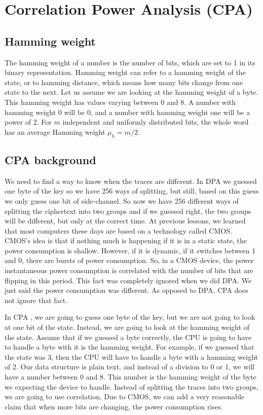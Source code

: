 \section{Correlation Power Analysis (CPA)}\label{c8_cpa:sec}

\subsection{Hamming weight}\label{c8_CPA_hamming_weight:subsec}

The hamming weight \cite{hamming} of a number is the number of bits, which are set to 1 in its binary
representation. Hamming weight can refer to a hamming weight of the state, or to
hamming distance, which means how many bits change from one state to the
next. Let us assume we are looking at the hamming weight of a byte. This hamming
weight has values varying between 0 and 8. A number with hamming weight 0 will be 0, and
a number with hamming weight one will be a power of 2. For $m$ independent and uniformly
distributed bits, the whole word has an average Hamming weight $\mu_h = m/2$.

\subsection{CPA background}\label{c8_CPA_background:subsec}

We need to find a way to know when the traces are different. In DPA \cite{kocher1999differential, kocher1998introduction} we guessed
one byte of the key so we have 256 ways of splitting, but still, based on this
guess we only guess one bit of side-channel. So now we have 256 different ways
of splitting the ciphertext into two groups and if we guessed right, the two
groups will be different, but only at the correct time.
At previous lessons, we learned that most computers these days are based on
a technology called CMOS. CMOS's idea is that if nothing much is happening
if it is in a static state,  the power consumption is shallow. However, if it is
dynamic, if it switches between 1 and 0, there are bursts of power consumption.
So, in a CMOS device, the power instantaneous power consumption is correlated
with the number of bits that are flipping in this period. This fact was
completely ignored when we did DPA. We just said the power consumption was
different. As opposed to DPA, CPA does not ignore that fact. 

In CPA \cite{brier2004correlation, coron1962statistics, mayer2000smartly, oswald2003side},
we are going to guess one byte of the key, but we are not going to look
at one bit of the state. Instead, we are going to look at the hamming weight of the
state. Assume that if we guessed a byte correctly, the CPU is going to have to
handle a byte with it is the hamming weight. For example, if we guessed that the
state was 3, then the CPU will have to handle a byte with a hamming weight of 2.
Our data structure is plain text, and instead of a division to 0 or 1, we will
have a number between 0 and 8. This number is the hamming weight of the byte we
expecting the device to handle. Instead of splitting the traces into two groups,
we are going to use correlation. Due to CMOS, we can add a very reasonable claim
that when more bits are changing, the power consumption rises.

